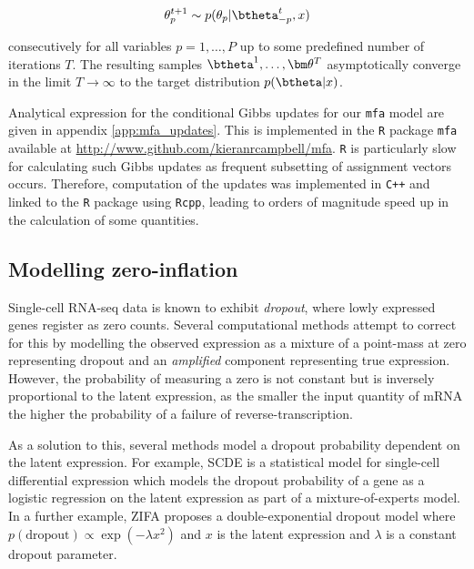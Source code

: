 \begin{equation}
		\theta_p^{t+1}  \sim p(\theta_p | \btheta^t_{-p}, x)
\end{equation}

consecutively for all variables $p = 1, \ldots, P$ up to some predefined number of iterations $T$. The resulting samples $\btheta^1, \ldots, \bm \theta^T$ asymptotically converge in the limit $T \rightarrow \infty$ to the target distribution $p(\btheta | x)$.

Analytical expression for the conditional Gibbs updates for our \texttt{mfa} model are given in appendix \ref{app:mfa_updates}. This is implemented in the \texttt{R} package \texttt{mfa} available at \url{http://www.github.com/kieranrcampbell/mfa}. \texttt{R} is particularly slow for calculating such Gibbs updates as frequent subsetting of assignment vectors occurs. Therefore, computation of the updates was implemented in \texttt{C++} and linked to the \texttt{R} package using \texttt{Rcpp}, leading to orders of magnitude speed up in the calculation of some quantities.

\subsection{Modelling zero-inflation}

Single-cell RNA-seq data is known to exhibit \emph{dropout}, where lowly expressed genes register as zero counts. Several computational methods attempt to correct for this by modelling the observed expression as a mixture of a point-mass at zero representing dropout and an \emph{amplified} component representing true expression. However, the probability of measuring a zero is not constant but is inversely proportional to the latent expression, as the smaller the input quantity of mRNA the higher the probability of a failure of reverse-transcription.

As a solution to this, several methods model a dropout probability dependent on the latent expression. For example, SCDE \cite{Kharchenko2014} is a statistical model for single-cell differential expression which models the dropout probability of a gene as a logistic regression on the latent expression as part of a mixture-of-experts model.
In a further example, ZIFA \cite{pierson2015zifa} proposes a double-exponential dropout model where $p(\text{dropout}) \propto \exp(-\lambda x^2)$ and $x$ is the latent expression and $\lambda$ is a constant dropout parameter.

